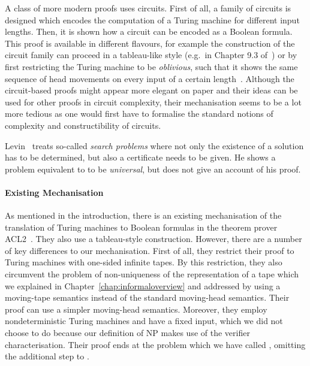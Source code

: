 A class of more modern proofs uses circuits. First of all, a family of circuits is designed which encodes the computation of a Turing machine for different input lengths. Then, it is shown how a circuit can be encoded as a Boolean formula. This proof is available in different flavours, for example the construction of the circuit family can proceed in a tableau-like style (e.g.\ in Chapter 9.3 of~\cite{Sipser:TheoryofComputation}) or by first restricting the Turing machine to be \textit{oblivious}, such that it shows the same sequence of head movements on every input of a certain length~\cite[p.~199ff]{Bläser:TISkript}.
Although the circuit-based proofs might appear more elegant on paper and their ideas can be used for other proofs in circuit complexity, their mechanisation seems to be a lot more tedious as one would first have to formalise the standard notions of complexity and constructibility of circuits.

Levin~\cite{levin_theorem} treats so-called \textit{search problems} where not only the existence of a solution has to be determined, but also a certificate needs to be given. He shows a problem equivalent to \SAT{} to be \textit{universal}, but does not give an account of his proof.

\paragraph{Existing Mechanisation}
As mentioned in the introduction, there is an existing mechanisation of the translation of Turing machines to Boolean formulas in the theorem prover ACL2~\cite{gamboa:cook}. They also use a tableau-style construction. However, there are a number of key differences to our mechanisation.
First of all, they restrict their proof to Turing machines with one-sided infinite tapes. By this restriction, they also circumvent the problem of non-uniqueness of the representation of a tape which we explained in Chapter~\ref{chap:informaloverview} and addressed by using a moving-tape semantics instead of the standard moving-head semantics. Their proof can use a simpler moving-head semantics.
Moreover, they employ nondeterministic Turing machines and have a fixed input, which we did not choose to do because our definition of NP makes use of the verifier characterisation. Their proof ends at the problem which we have called \fsat{}, omitting the additional step to \sat{}.

